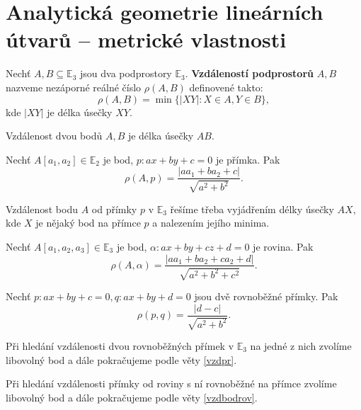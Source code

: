 \section{Analytická geometrie lineárních útvarů -- metrické vlastnosti}
\begin{definition}
    Nechť $A,B\subseteq \mathbb E_3$ jsou dva podprostory $\mathbb E_3$. \textbf{Vzdáleností
    podprostorů} $A,B$ nazveme nezáporné reálné číslo $\rho(A,B)$ definovené takto:
    $$\rho(A,B) = \min \{ |XY|: X\in A, Y\in B \},$$
    kde $|XY|$ je délka úsečky $XY.$
\end{definition}

\begin{veta}
    Vzdálenost dvou bodů $A,B$ je délka úsečky $AB.$
\end{veta}

\begin{veta}
    Nechť $A[a_1,a_2]\in \mathbb E_2$ je bod, $p:ax+by+c=0$ je přímka. Pak
    $$\rho(A,p)=\frac{|aa_1+ba_2+c|}{\sqrt{a^2+b^2} }.$$
\end{veta}

\begin{pozn}
    Vzdálenost bodu $A$ od přímky $p$ v $\mathbb E_3$ řešíme třeba vyjádřením délky úsečky
    $AX,$ kde $X$ je nějaký bod na přímce $p$ a nalezením jejího minima.
\end{pozn}

\begin{veta}\label{vzdbodrov}
    Nechť $A[a_1,a_2,a_3]\in \mathbb E_3$ je bod, $\alpha:ax+by+cz+d=0$ je rovina. Pak
    $$\rho(A,\alpha)=\frac{|aa_1+ba_2+ca_2+d|}{\sqrt{a^2+b^2+c^2} }.$$
\end{veta}

\begin{veta}\label{vzdpr}
    Nechť $p:ax+by+c=0,q:ax+by+d=0$ jsou dvě rovnoběžné přímky. Pak
    $$\rho(p,q)=\frac{|d-c|}{\sqrt{a^2+b^2} }.$$
\end{veta}

\begin{pozn}
    Při hledání vzdálenosti dvou rovnoběžných přímek v $\mathbb E_3$ na jedné z nich zvolíme
    libovolný bod a dále pokračujeme podle věty \ref{vzdpr}.
\end{pozn}

\begin{pozn}
    Při hledání vzdálenosti přímky od roviny s ní rovnoběžné na přímce zvolíme
    libovolný bod a dále pokračujeme podle věty \ref{vzdbodrov}.
\end{pozn}

